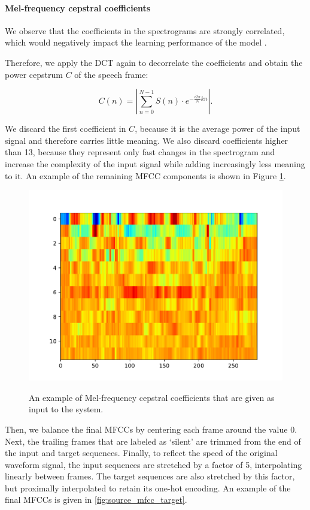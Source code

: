 		\paragraph{Mel-frequency cepstral coefficients}

			We observe that the coefficients in the spectrograms are strongly correlated, which would negatively impact the learning performance of the model .

			Therefore, we apply the DCT again to decorrelate the coefficients and obtain the power cepstrum $C$ of the speech frame:

			\begin{equation}\label{eq:magframes}
				C(n) = \left|\sum_{n=0}^{N-1}S(n)\cdot e^{-\frac{i2\pi}{N}kn}\right|.
			\end{equation}

			We discard the first coefficient in $C$, because it is the average power of the input signal and therefore carries little meaning.
			We also discard coefficients higher than 13, because they represent only fast changes in the spectrogram and increase the complexity of the input signal while adding increasingly less meaning to it. 
			An example of the remaining MFCC components is shown in Figure \ref{fig:mfccs}.

			\begin{figure}[ht]
				\centering
			    \includegraphics[width=.45\linewidth]{gfx/mfcc}
			    \label{fig:mfccs}
			    \caption{An example of Mel-frequency cepstral coefficients that are given as input to the system.}
			\end{figure}

			Then, we balance the final MFCCs by centering each frame around the value 0.
			Next, the trailing frames that are labeled as `silent' are trimmed from the end of the input and target sequences.
			Finally, to reflect the speed of the original waveform signal, the input sequences are stretched by a factor of 5, interpolating linearly between frames.
			The target sequences are also stretched by this factor, but proximally interpolated to retain its one-hot encoding.
			An example of the final MFCCs is given in \ref{fig:source_mfcc_target}.

